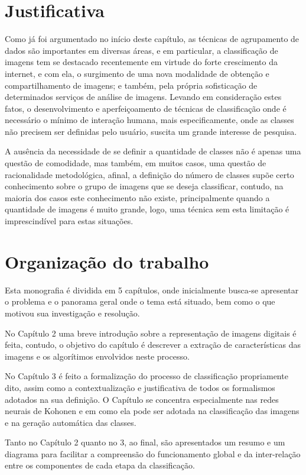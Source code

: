 \section{Justificativa}

Como já foi argumentado no início deste capítulo, as técnicas de agrupamento de
dados são importantes em diversas áreas, e em particular, a classificação de
imagens tem se destacado recentemente em virtude do forte crescimento da
internet, e com ela, o surgimento de uma nova modalidade de obtenção e
compartilhamento de imagens; e também, pela própria sofisticação de determinados
serviços de análise de imagens. Levando em consideração estes fatos, o
desenvolvimento e aperfeiçoamento de técnicas de classificação onde é necessário
o mínimo de interação humana, mais especificamente, onde as classes não precisem
ser definidas pelo usuário, suscita um grande interesse de pesquisa.

A ausência da necessidade de se definir a quantidade de classes não é apenas
uma questão de comodidade, mas também, em muitos casos, uma questão de
racionalidade metodológica, afinal, a definição do número de classes supõe certo
conhecimento sobre o grupo de imagens que se deseja classificar, contudo, na
maioria dos casos este conhecimento não existe, principalmente quando a
quantidade de imagens é muito grande, logo, uma técnica sem esta limitação é
imprescindível para estas situações.

\section{Organização do trabalho}

Esta monografia é dividida em 5 capítulos, onde inicialmente busca-se apresentar o
problema e o panorama geral onde o tema está situado, bem como o que motivou sua
investigação e resolução.

No Capítulo 2 uma breve introdução sobre a representação de imagens digitais é
feita, contudo, o objetivo do capítulo é descrever a extração de características
das imagens e os algorítimos envolvidos neste processo.

No Capítulo 3 é feito a formalização do processo de classificação propriamente
dito, assim como a contextualização e justificativa de todos os formalismos
adotados na sua definição. O Capítulo se concentra especialmente nas redes
neurais de Kohonen e em como ela pode ser adotada na classificação das imagens
e na geração automática das classes.

Tanto no Capítulo 2 quanto no 3, ao final, são apresentados um resumo e um
diagrama para facilitar a compreensão do funcionamento global e da inter-relação
entre os componentes de cada etapa da classificação.


